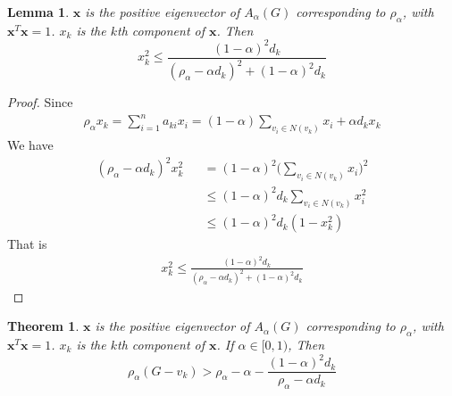 \documentclass[amsthm]{elsart}
\newtheorem{theorem}{Theorem}[section]
\newtheorem{lemma}{Lemma}[section]
\begin{document}
\begin{lemma} \label{lem:3}
$\textbf{x}$ is the positive eigenvector of $A_\alpha (G)$ corresponding to $\rho _\alpha$, with $\textbf{x}^T \textbf{x} = 1$. $x_k$ is the $k$th component of $\textbf{x}$. Then \\
\begin{equation} \label{equ:14}
x_k^2 \leqslant \frac{(1 - \alpha)^2 d_k}{(\rho _\alpha - \alpha d_k)^2 + (1 - \alpha)^2 d_k}
\end{equation}
\end{lemma}

\begin{proof}
Since
\begin{eqnarray*}
\rho _\alpha x_k = \sum \limits_{i = 1}^{n} a_{ki} x_i = (1 - \alpha) \sum \limits_{v_i \in N(v_k)}^{} x_i + \alpha d_k x_k
\end{eqnarray*}
We have
\begin{eqnarray*}
 (\rho _\alpha - \alpha d_k)^2 x_k^2
    &&= (1 - \alpha)^2 \big(\sum \limits_{v_i \in N(v_k)}^{} x_i \big)^2
    \\ &&\leqslant  (1 - \alpha)^2 d_k \sum \limits_{v_i \in N(v_k)}^{} x_i^2
    \\ &&\leqslant  (1 - \alpha)^2 d_k (1 - x_k^2)
\end{eqnarray*}
That is
\begin{eqnarray*}
x_k^2 \leqslant \frac{(1 - \alpha)^2 d_k}{(\rho _\alpha - \alpha d_k)^2 + (1 - \alpha)^2 d_k}
\end{eqnarray*}
\end{proof}

\begin{theorem} \label{the:4}
$\textbf{x}$ is the positive eigenvector of $A_\alpha (G)$ corresponding to $\rho _\alpha$, with $\textbf{x}^T \textbf{x} = 1$. $x_k$ is the $k$th component of $\textbf{x}$. If $\alpha \in [0, 1)$, Then \\
\begin{equation} \label{equ:16}
\rho _\alpha (G - v_k)
  > \rho _\alpha - \alpha - \frac{(1 - \alpha)^2 d_k}{\rho _\alpha - \alpha d_k}
\end{equation}
\end{theorem}
\end{document}
